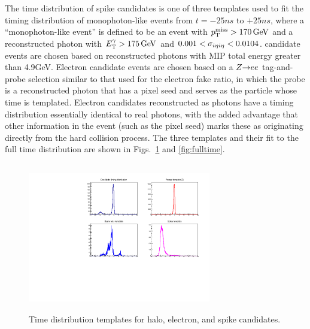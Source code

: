 The time distribution of spike candidates is one of three templates used to fit the timing distribution of monophoton-like events from $t = -25\unit{ns}$ to $+25\unit{ns}$,
where a ``monophoton-like event'' is defined to be an event with $\MET > 170\unit{GeV}$ and a reconstructed photon with $\ETgamma > 175\unit{GeV}$ and $0.001 < \sieie < 0.0104$.
candidate events are chosen based on reconstructed photons with MIP total energy greater than 4.9\unit{GeV}. Electron candidate events are chosen based on a
$\PZ{\rightarrow}\Pe\Pe$ tag-and-probe selection similar to that used for the electron fake ratio, in which the probe is a reconstructed photon that has a pixel
seed and serves as the particle whose time is templated. Electron candidates reconstructed as photons have a timing distribution essentially identical to real
photons, with the added advantage that other information in the event (such as the pixel seed) marks these as originating directly from the hard collision process.
The three templates and their fit to the full time distribution are shown in Figs.~\ref{fig:fulltime_templates} and \ref{fig:fulltime}.

\begin{figure}
  \begin{center}
    \includegraphics[width=8.0cm,height=6.5cm]{Figures/noncol/TemplatesQuadZ.pdf}
    \caption{
      Time distribution templates for halo, electron, and spike candidates.
    }
    \label{fig:fulltime_templates}
  \end{center}
\end{figure}

